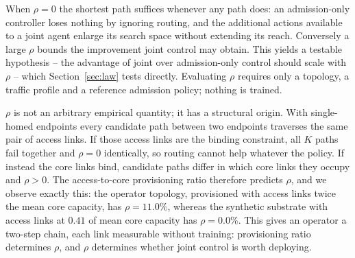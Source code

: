 \documentclass[10pt,journal,comsoc]{IEEEtran}
\begin{document}
When $\rho=0$ the shortest path suffices whenever any path does: an
admission-only controller loses nothing by ignoring routing, and the
additional actions available to a joint agent enlarge its search space
without extending its reach. Conversely a large $\rho$ bounds the
improvement joint control may obtain. This yields a testable hypothesis --
the advantage of joint over admission-only control should scale with
$\rho$ -- which Section~\ref{sec:law} tests directly. Evaluating $\rho$
requires only a topology, a traffic profile and a reference admission
policy; nothing is trained.

$\rho$ is not an arbitrary empirical quantity; it has a structural origin.
With single-homed endpoints every candidate path between two endpoints
traverses the same pair of access links. If those access links are the
binding constraint, all $K$ paths fail together and $\rho=0$ identically,
so routing cannot help whatever the policy. If instead the core links
bind, candidate paths differ in which core links they occupy and $\rho>0$.
The access-to-core provisioning ratio therefore predicts $\rho$, and we
observe exactly this: the operator topology, provisioned with access links
twice the mean core capacity, has $\rho=11.0\%$, whereas the synthetic
substrate with access links at $0.41$ of mean core capacity has
$\rho=0.0\%$. This gives an operator a two-step chain, each link
measurable without training: provisioning ratio determines $\rho$, and
$\rho$ determines whether joint control is worth deploying.
\end{document}
